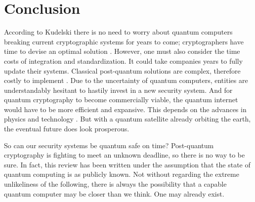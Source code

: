 \section{Conclusion}
According to Kudelski there is no need to worry about quantum computers breaking current cryptographic systems for years to come; cryptographers have time to devise an optimal solution \cite{Impact_QC_Cryptog}. However, one must also consider the time costs of integration and standardization. It could take companies years to fully update their systems. Classical post-quantum solutions are complex, therefore costly to implement \cite{Sec_Risk}. Due to the uncertainty of quantum computers, entities are understandably hesitant to hastily invest in a new security system. And for quantum cryptography to become commercially viable, the quantum internet would have to be more efficient and expansive. This depends on the advances in physics and technology \cite{Q_Cryptog}. But with a quantum satellite already orbiting the earth, the eventual future does look prosperous.

So can our security systems be quantum safe on time? Post-quantum cryptography is fighting to meet an unknown deadline, so there is no way to be sure. In fact, this review has been written under the assumption that the state of quantum computing is as publicly known. Not without regarding the extreme unlikeliness of the following, there is always the possibility that a capable quantum computer may be closer than we think. One may already exist. 